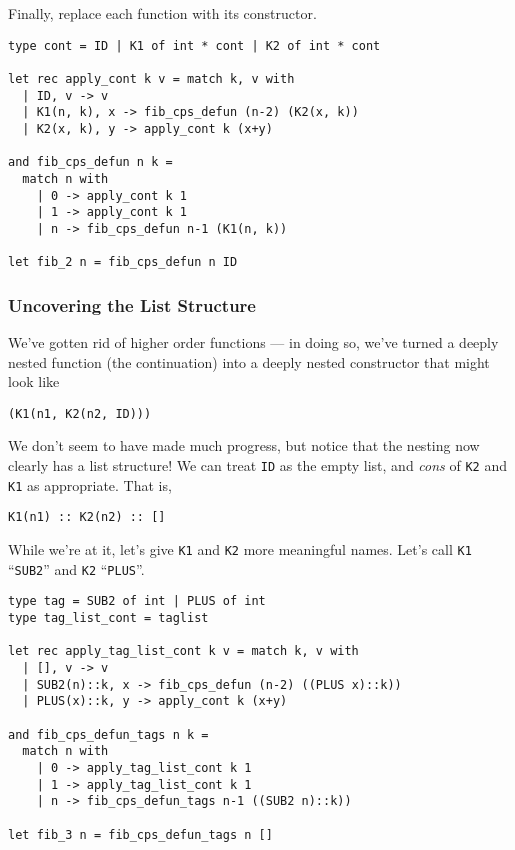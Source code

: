 Finally, replace each function with its constructor. 

\begin{code}
\label{code:defun-fib-3}
\begin{verbatim}
type cont = ID | K1 of int * cont | K2 of int * cont

let rec apply_cont k v = match k, v with
  | ID, v -> v
  | K1(n, k), x -> fib_cps_defun (n-2) (K2(x, k))
  | K2(x, k), y -> apply_cont k (x+y)

and fib_cps_defun n k = 
  match n with
    | 0 -> apply_cont k 1
    | 1 -> apply_cont k 1
    | n -> fib_cps_defun n-1 (K1(n, k))

let fib_2 n = fib_cps_defun n ID
\end{verbatim}
\end{code}

\subsubsection{Uncovering the List Structure}
We've gotten rid of higher order functions --- in doing so, we've turned a deeply nested function (the continuation) into a deeply nested constructor that might look like
\begin{verbatim}
(K1(n1, K2(n2, ID)))
\end{verbatim}
We don't seem to have made much progress, but notice that the nesting now clearly has a list structure! We can treat \texttt{ID} as the empty list, and \emph{cons} of \texttt{K2} and \texttt{K1} as appropriate. That is, 
\begin{verbatim}
K1(n1) :: K2(n2) :: []
\end{verbatim}

While we're at it, let's give \texttt{K1} and \texttt{K2} more meaningful names. Let's call \texttt{K1} ``\texttt{SUB2}'' and \texttt{K2} ``\texttt{PLUS}''. 

\begin{code}
\label{code:defun-fib-list}
\begin{verbatim}
type tag = SUB2 of int | PLUS of int
type tag_list_cont = taglist

let rec apply_tag_list_cont k v = match k, v with
  | [], v -> v
  | SUB2(n)::k, x -> fib_cps_defun (n-2) ((PLUS x)::k))
  | PLUS(x)::k, y -> apply_cont k (x+y)

and fib_cps_defun_tags n k = 
  match n with
    | 0 -> apply_tag_list_cont k 1
    | 1 -> apply_tag_list_cont k 1
    | n -> fib_cps_defun_tags n-1 ((SUB2 n)::k))

let fib_3 n = fib_cps_defun_tags n []
\end{verbatim}
\end{code}

